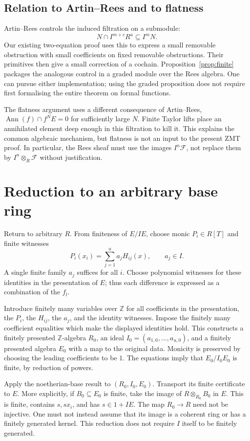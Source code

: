 \documentclass[11pt]{amsart}
\theoremstyle{definition}
\theoremstyle{remark}
\newcommand{\FF}{\mathcal F}
\begin{document}
\subsection*{Relation to Artin--Rees and to flatness}
Artin--Rees controls the induced filtration on a submodule:
\[
 N\cap I^{m+c}R^a\subseteq I^mN.
\]
Our existing two-equation proof uses this to express a small
removable obstruction with small coefficients on fixed removable
obstructions. Their primitives then give a small correction of a
cochain. Proposition~\ref{prop:finite} packages the analogous control
in a graded module over the Rees algebra. One can pursue either
implementation; using the graded proposition does not require first
formalising the entire theorem on formal functions.

The flatness argument uses a different consequence of Artin--Rees,
$\operatorname{Ann}(f)\cap f^NE=0$ for sufficiently large $N$.
Finite Taylor lifts place an annihilated element deep enough in this
filtration to kill it. This explains the common algebraic mechanism,
but flatness is not an input to the present ZMT proof. In particular,
the Rees sheaf must use the images $I^n\FF$, not replace them by
$I^n\otimes_R\FF$ without justification.

\section{Reduction to an arbitrary base ring}\label{sec:descent}

Return to arbitrary $R$. From finiteness of $E/IE$, choose monic
$P_i\in R[T]$ and finite witnesses
\[
 P_i(x_i)=\sum_{j=1}^u a_j H_{ij}(x),\qquad a_j\in I.
\]
A single finite family $a_j$ suffices for all $i$. Choose polynomial
witnesses for these identities in the presentation of $E$; thus each
difference is expressed as a combination of the $f_l$.

Introduce finitely many variables over $\mathbb Z$ for all coefficients
in the presentation, the $P_i$, the $H_{ij}$, the $a_j$, and the
identity witnesses. Impose the finitely many coefficient equalities
which make the displayed identities hold. This constructs a finitely
presented $\mathbb Z$-algebra $R_0$, an ideal
$I_0=(a_{1,0},\ldots,a_{u,0})$, and a finitely presented algebra $E_0$
with a map to the original data. Monicity is preserved by choosing
the leading coefficients to be $1$. The equations imply that
$E_0/I_0E_0$ is finite, by reduction of powers.

Apply the noetherian-base result to $(R_0,I_0,E_0)$. Transport its
finite certificate to $E$. More explicitly, if $B_0\subseteq E_0$
is finite, take the image of $R\otimes_{R_0}B_0$ in $E$.
This is finite, contains $s,sx_i$, and has $s\in1+IE$.
The map $R_0\to R$ need not be injective. One must not instead assume
that its image is a coherent ring or has a finitely generated kernel.
This reduction does not require $I$ itself to be finitely generated.
\end{document}
